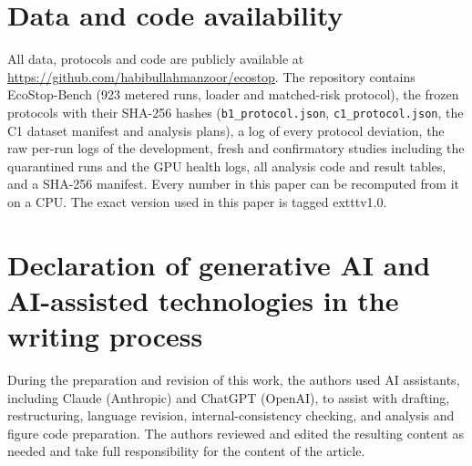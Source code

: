 \documentclass[3p,twocolumn,10pt]{elsarticle}
\theoremstyle{definition}
\begin{document}
\section*{Data and code availability}
All data, protocols and code are publicly available at \url{https://github.com/habibullahmanzoor/ecostop}. The repository contains EcoStop-Bench (923 metered runs, loader and matched-risk protocol), the frozen protocols with their SHA-256 hashes (\texttt{b1\_protocol.json}, \texttt{c1\_protocol.json}, the C1 dataset manifest and analysis plans), a log of every protocol deviation, the raw per-run logs of the development, fresh and confirmatory studies including the quarantined runs and the GPU health logs, all analysis code and result tables, and a SHA-256 manifest. Every number in this paper can be recomputed from it on a CPU. The exact version used in this paper is tagged 	exttt{v1.0}.

\section*{Declaration of generative AI and AI-assisted technologies in the writing process}
During the preparation and revision of this work, the authors used AI assistants, including Claude (Anthropic) and ChatGPT (OpenAI), to assist with drafting, restructuring, language revision, internal-consistency checking, and analysis and figure code preparation. The authors reviewed and edited the resulting content as needed and take full responsibility for the content of the article.



\end{document}
